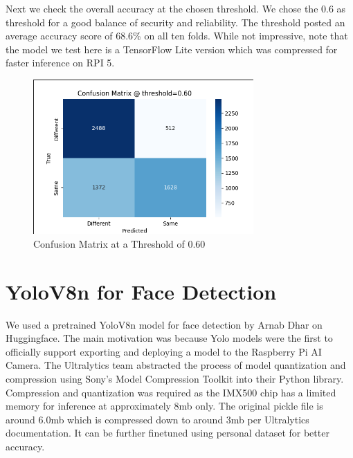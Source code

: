 \clearpage
Next we check the overall accuracy at the chosen threshold. We chose the 0.6 as threshold for a good balance of security and reliability. The threshold posted an average accuracy score of 68.6\% on all ten folds. While not impressive, note that the model we test here is a TensorFlow Lite version which was compressed for faster inference on RPI 5.
\begin{figure}[h] %
	\centering
	\includegraphics[width=0.75\textwidth]{figures/chapter4/fixed_thresh_matrix.png} %
	\caption{Confusion Matrix at a Threshold of 0.60}
	\label{fig:fixed_thresh}
\end{figure}



\section{YoloV8n for Face Detection}
We used a pretrained YoloV8n model for face detection by Arnab Dhar on Huggingface. The main motivation was because Yolo models were the first to officially support exporting and deploying a model to the Raspberry Pi AI Camera. The Ultralytics team abstracted the process of model quantization and compression using Sony's Model Compression Toolkit into their Python library. Compression and quantization was required as the IMX500 chip has a limited memory for inference at approximately 8mb only. The original pickle file is around 6.0mb which is compressed down to around 3mb per Ultralytics documentation. It can be further finetuned using personal dataset for better accuracy. 





